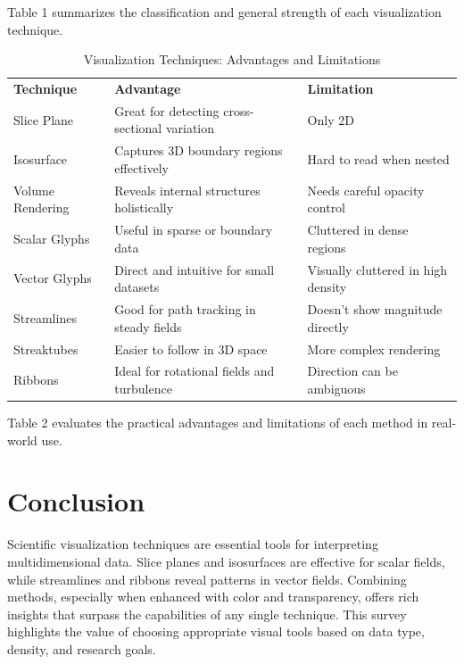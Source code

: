 \documentclass[11pt]{article}
\begin{document}
	\noindent Table 1 summarizes the classification and general strength of each visualization technique.
	
	\vspace{3em}
	
	\begin{table}[H]
		\centering
		\caption{Visualization Techniques: Advantages and Limitations}
		\renewcommand{\arraystretch}{1.3}
		\begin{tabular}{|l|l|l|}
			\hline
			\textbf{Technique} & \textbf{Advantage} & \textbf{Limitation} \\

			Slice Plane        & Great for detecting cross-sectional variation & Only 2D \\

			Isosurface         & Captures 3D boundary regions effectively      & Hard to read when nested \\

			Volume Rendering   & Reveals internal structures holistically     & Needs careful opacity control \\

			Scalar Glyphs      & Useful in sparse or boundary data            & Cluttered in dense regions \\

			Vector Glyphs      & Direct and intuitive for small datasets      & Visually cluttered in high density \\

			Streamlines        & Good for path tracking in steady fields      & Doesn't show magnitude directly \\

			Streaktubes        & Easier to follow in 3D space                 & More complex rendering \\

			Ribbons            & Ideal for rotational fields and turbulence   & Direction can be ambiguous \\
			\hline
		\end{tabular}
	\end{table}
	
	\noindent Table 2 evaluates the practical advantages and limitations of each method in real-world use.
	
	\section{Conclusion}
	Scientific visualization techniques are essential tools for interpreting multidimensional data. Slice planes and isosurfaces are effective for scalar fields, while streamlines and ribbons reveal patterns in vector fields. Combining methods, especially when enhanced with color and transparency, offers rich insights that surpass the capabilities of any single technique. This survey highlights the value of choosing appropriate visual tools based on data type, density, and research goals.
	
\end{document}
